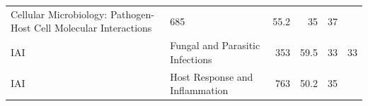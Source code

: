\documentclass[11pt,]{article}
\begin{document}
\begin{longtable}[]{@{}llrrrr@{}}
\begin{minipage}[t]{0.43\columnwidth}
Cellular Microbiology: Pathogen-Host Cell Molecular Interactions\strut
\end{minipage} & \begin{minipage}[t]{0.04\columnwidth}\raggedleft\strut
685\strut
\end{minipage} & \begin{minipage}[t]{0.08\columnwidth}\raggedleft\strut
55.2\strut
\end{minipage} & \begin{minipage}[t]{0.11\columnwidth}\raggedleft\strut
35\strut
\end{minipage} & \begin{minipage}[t]{0.11\columnwidth}\raggedleft\strut
37\strut
\end{minipage}\tabularnewline
\begin{minipage}[t]{0.06\columnwidth}\raggedright\strut
IAI\strut
\end{minipage} & \begin{minipage}[t]{0.43\columnwidth}\raggedright\strut
Fungal and Parasitic Infections\strut
\end{minipage} & \begin{minipage}[t]{0.04\columnwidth}\raggedleft\strut
353\strut
\end{minipage} & \begin{minipage}[t]{0.08\columnwidth}\raggedleft\strut
59.5\strut
\end{minipage} & \begin{minipage}[t]{0.11\columnwidth}\raggedleft\strut
33\strut
\end{minipage} & \begin{minipage}[t]{0.11\columnwidth}\raggedleft\strut
33\strut
\end{minipage}\tabularnewline
\begin{minipage}[t]{0.06\columnwidth}\raggedright\strut
IAI\strut
\end{minipage} & \begin{minipage}[t]{0.43\columnwidth}\raggedright\strut
Host Response and Inflammation\strut
\end{minipage} & \begin{minipage}[t]{0.04\columnwidth}\raggedleft\strut
763\strut
\end{minipage} & \begin{minipage}[t]{0.08\columnwidth}\raggedleft\strut
50.2\strut
\end{minipage} & \begin{minipage}[t]{0.11\columnwidth}\raggedleft\strut
35\strut
\end{minipage} & \begin{minipage}[t]{0.11\columnwidth}\raggedleft\strut

\end{minipage}
\end{longtable}
\end{document}

